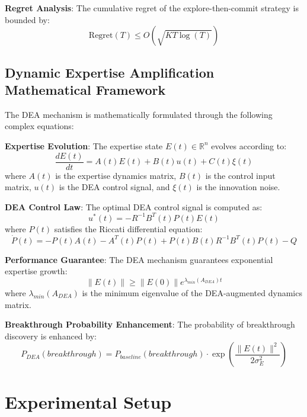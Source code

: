 \documentclass[letterpaper]{article} %
\begin{document}
\textbf{Regret Analysis}: The cumulative regret of the explore-then-commit strategy is bounded by:
\begin{equation}
\text{Regret}(T) \leq O\left(\sqrt{KT \log(T)}\right)
\end{equation}

\subsection{Dynamic Expertise Amplification Mathematical Framework}

The DEA mechanism is mathematically formulated through the following complex equations:

\textbf{Expertise Evolution}: The expertise state $E(t) \in \mathbb{R}^n$ evolves according to:
\begin{equation}
\frac{dE(t)}{dt} = A(t)E(t) + B(t)u(t) + C(t)\xi(t)
\end{equation}
where $A(t)$ is the expertise dynamics matrix, $B(t)$ is the control input matrix, $u(t)$ is the DEA control signal, and $\xi(t)$ is the innovation noise.

\textbf{DEA Control Law}: The optimal DEA control signal is computed as:
\begin{equation}
u^*(t) = -R^{-1}B^T(t)P(t)E(t)
\end{equation}
where $P(t)$ satisfies the Riccati differential equation:
\begin{equation}
\dot{P}(t) = -P(t)A(t) - A^T(t)P(t) + P(t)B(t)R^{-1}B^T(t)P(t) - Q
\end{equation}

\textbf{Performance Guarantee}: The DEA mechanism guarantees exponential expertise growth:
\begin{equation}
\|E(t)\| \geq \|E(0)\| e^{\lambda_{min}(A_{DEA})t}
\end{equation}
where $\lambda_{min}(A_{DEA})$ is the minimum eigenvalue of the DEA-augmented dynamics matrix.

\textbf{Breakthrough Probability Enhancement}: The probability of breakthrough discovery is enhanced by:
\begin{equation}
P_{DEA}(breakthrough) = P_{baseline}(breakthrough) \cdot \exp\left(\frac{\|E(t)\|^2}{2\sigma_E^2}\right)
\end{equation}

\section{Experimental Setup}
\end{document}
